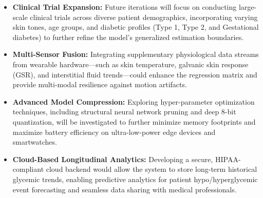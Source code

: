 \begin{itemize}
    \item \textbf{Clinical Trial Expansion:} Future iterations will focus on conducting large-scale clinical trials across diverse patient demographics, incorporating varying skin tones, age groups, and diabetic profiles (Type 1, Type 2, and Gestational diabetes) to further refine the model's generalized estimation boundaries.
    \item \textbf{Multi-Sensor Fusion:} Integrating supplementary physiological data streams from wearable hardware—such as skin temperature, galvanic skin response (GSR), and interstitial fluid trends—could enhance the regression matrix and provide multi-modal resilience against motion artifacts.
    \item \textbf{Advanced Model Compression:} Exploring hyper-parameter optimization techniques, including structural neural network pruning and deep 8-bit quantization, will be investigated to further minimize memory footprints and maximize battery efficiency on ultra-low-power edge devices and smartwatches.
    \item \textbf{Cloud-Based Longitudinal Analytics:} Developing a secure, HIPAA-compliant cloud backend would allow the system to store long-term historical glycemic trends, enabling predictive analytics for patient hypo/hyperglycemic event forecasting and seamless data sharing with medical professionals.
\end{itemize}